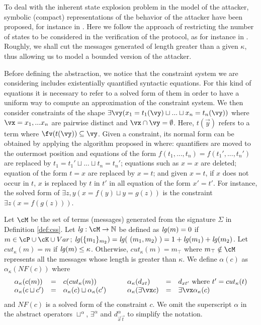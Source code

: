 \documentclass{tlp}
\begin{document}
To deal with the inherent state explosion problem in the model of the attacker, 
symbolic (compact) representations of the behavior of the attacker 
have been proposed, for instance in 
\cite{boreale01symbolic,compsym-fiore,Olarte:08:SAC,BBD10}. Here we  follow the approach of restricting  the number of states to be considered in the verification of the protocol, as for instance  in \cite{DBLP:journals/corr/abs-1105-5282,SongBP01,DBLP:journals/ijisec/ArmandoC08}. Roughly, we  shall cut the messages generated   of length greater  than a given $\kappa$, thus allowing us to model a bounded version of the attacker. 

Before defining the abstraction, we notice that the constraint system  we are considering includes existentially quantified syntactic  equations. For this kind of equations it is necessary to refer to a solved form of them  in order to have a uniform way to compute an approximation of the constraint system. We then consider constraints of the shape $\exists \vy (x_1 = t_1(\vy) \sqcup ... \sqcup x_n=t_n(\vy))$ where $\vx= x_1,...x_n$ are pairwise distinct   and $\vx \cap \vy = \emptyset$. Here,  
$t(\vec{y})$  refers to a term where $\fv(t(\vy)) \subseteq \vy$. Given a constraint, its normal form  can be obtained by applying the algorithm proposed in \cite{Mah88b} where: quantifiers are moved to the outermost position and equations of the form $f(t_1,...,t_n) =f(t_1',...,t_n')$
are replaced by  $t_1=t_1' \sqcup ... \sqcup t_n = t_n'$; equations such as   $x=x$ are deleted; equation of the form $t=x$ are replaced by $x=t$; and given $x=t$, if $x$ does not occur in $t$, $x$ is replaced by $t$ in $t'$ in all equation of the form $x'=t'$.  For instance, the solved form of $ \exists z, y ( x=f(y) \sqcup y=g(z) )$ is the constraint $\exists z (x=f(g(z) ))$.



\begin{definition}\label{def:abs-sec-cs}
Let $\cM$ be the set of terms (messages) generated from the signature $\Sigma$ in Definition \ref{def:css}. Let   ${\it lg}: \cM \to \mathbb{N}$ be defined as 
${\it lg}(m) = 0$ if $m\in \cP\cup\cK\cup Var$; ${\it lg}(\{m_1\}_{m_2}) = {\it lg} (\  (m_1,m_2)\ ) = 1 + {\it lg}(m_1) + {\it lg}(m_2)$. 
Let $cut_\kappa(m)= m $ if  ${\it lg}(m) \leq \kappa$. Otherwise,  $cut_\kappa(m)=m_{\top}$  
where $m_{\top}\notin \cM$  represents  all the messages  whose length is greater than $\kappa$. 
We define $\alpha(c)$ as $\alpha_{\kappa}(NF(c))$ where
\[
\begin{array}{llll l llll}
\alpha_{\kappa}(c(m)) &=&c(cut_\kappa(m))
& \quad &
\alpha_{\kappa}(d_{xt}) &=& d_{xt'} \mbox{ where } t' = cut_\kappa(t)
\\
\alpha_{\kappa}(c \sqcup c') &=& \alpha_{\kappa}(c) \sqcup \alpha_{\kappa}(c') 
& \quad &
\alpha_{\kappa}(\exists \vx c ) &=& \exists \vx \alpha_{\kappa}(c) \\
\end{array}
\]
and $NF(c)$ is a solved form  of the constraint $c$.
We  omit the superscript $\alpha$ in the abstract operators $\sqcup^{\alpha}$, $\exists^{\alpha}$ and $d_{\vec{x}\vec{t}}^{\alpha}$ to simplify the notation. 
\end{definition}
\end{document}
